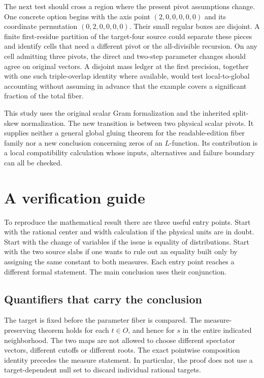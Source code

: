 \documentclass[12pt,letterpaper]{article}
\begin{document}
The next test should cross a region where the present pivot assumptions change. One concrete option begins with the axis point $(2,0,0,0,0,0)$ and its coordinate permutation $(0,2,0,0,0,0)$. Their small regular boxes are disjoint. A finite first-residue partition of the target-four source could separate these pieces and identify cells that need a different pivot or the all-divisible recursion. On any cell admitting three pivots, the direct and two-step parameter changes should agree on original vectors. A disjoint mass ledger at the first precision, together with one such triple-overlap identity where available, would test local-to-global accounting without assuming in advance that the example covers a significant fraction of the total fiber.

This study uses the original scalar Gram formalization and the inherited split-skew normalization. The new transition is between two physical scalar pivots. It supplies neither a general global gluing theorem for the readable-edition fiber family nor a new conclusion concerning zeros of an $L$-function. Its contribution is a local compatibility calculation whose inputs, alternatives and failure boundary can all be checked.

\section{A verification guide}
To reproduce the mathematical result there are three useful entry points. Start with the rational center and width calculation if the physical units are in doubt. Start with the change of variables if the issue is equality of distributions. Start with the two source slabs if one wants to rule out an equality built only by assigning the same constant to both measures. Each entry point reaches a different formal statement. The main conclusion uses their conjunction.

\subsection{Quantifiers that carry the conclusion}
The target is fixed before the parameter fiber is compared. The measure-preserving theorem holds for each $t\in O$, and hence for $s$ in the entire indicated neighborhood. The two maps are not allowed to choose different spectator vectors, different cutoffs or different roots. The exact pointwise composition identity precedes the measure statement. In particular, the proof does not use a target-dependent null set to discard individual rational targets.
\end{document}
